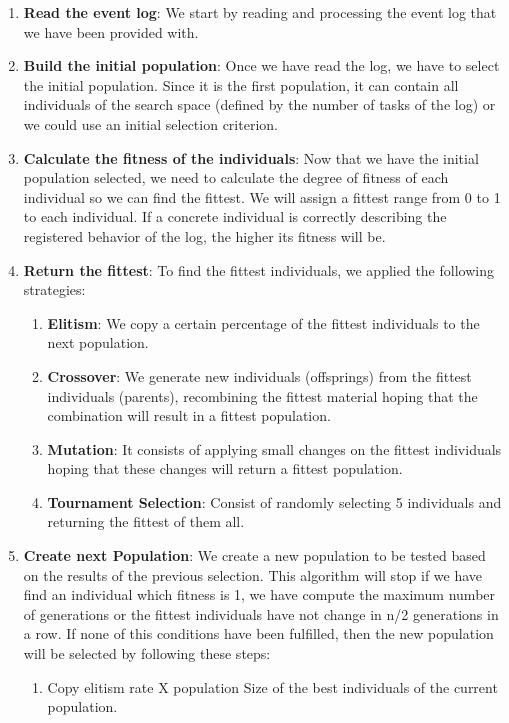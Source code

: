 \documentclass[conference]{IEEEtran}
\begin{document}
\begin{enumerate}
    \item \textbf{Read the event log}: We start by reading and processing the event log that we have been provided with.
    \item \textbf{Build the initial population}: Once we have read the log, we have to select the initial population. Since it is the first population, it can contain all individuals of the search space (defined by the number of tasks of the log) or we could use an initial selection criterion.
    \item \textbf{Calculate the fitness of the individuals}: Now that we have the initial population selected, we need to calculate the degree of fitness of each individual so we can find the fittest. We will assign a fittest range from 0 to 1 to each individual. If a concrete individual is correctly describing the registered behavior of the log, the higher its fitness will be.
    \item \textbf{Return the fittest}: To find the fittest individuals, we applied the following strategies:
    \begin{enumerate}
        \item \textbf{Elitism}: We copy a certain percentage of the fittest individuals to the next population.
        \item \textbf{Crossover}: We generate new individuals (offsprings) from the fittest individuals (parents), recombining the fittest material hoping that the combination will result in a fittest population.
        \item \textbf{Mutation}: It consists of applying small changes on the fittest individuals hoping that these changes will return a fittest population.
        \item \textbf{Tournament Selection}: Consist of randomly selecting 5 individuals and returning the fittest of them all.
    \end{enumerate}
    \item \textbf{Create next Population}:  We create a new population to be tested based on the results of the previous selection. This algorithm will stop if we have find an individual which fitness is 1, we have compute the maximum number of generations or the fittest individuals have not change in n/2 generations in a row.
    If none of this conditions have been fulfilled, then the new population will be selected by following these steps:
    \begin{enumerate}
        \item Copy elitism rate X population Size of the best individuals of the current population.

\end{enumerate}
\end{enumerate}
\end{document}

